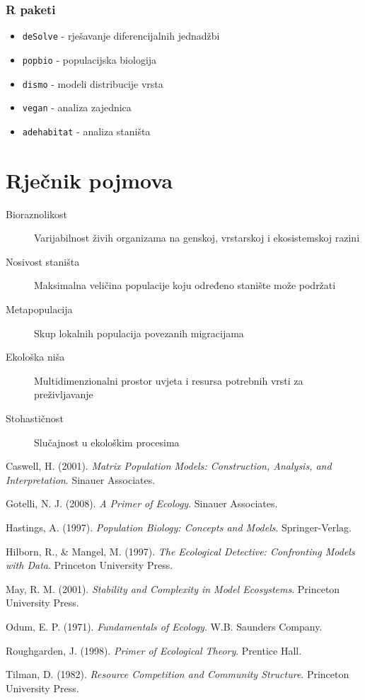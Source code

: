 \documentclass[12pt,a4paper,twoside]{book}
\begin{document}
	\subsection{R paketi}
	\begin{itemize}
		\item \texttt{deSolve} - rješavanje diferencijalnih jednadžbi
		\item \texttt{popbio} - populacijska biologija
		\item \texttt{dismo} - modeli distribucije vrsta
		\item \texttt{vegan} - analiza zajednica
		\item \texttt{adehabitat} - analiza staništa
	\end{itemize}
	
	\chapter{Rječnik pojmova}
	
	\begin{description}
		\item[Bioraznolikost] Varijabilnost živih organizama na genskoj, vrstarskoj i ekosistemskoj razini
		\item[Nosivost staništa] Maksimalna veličina populacije koju određeno stanište može podržati
		\item[Metapopulacija] Skup lokalnih populacija povezanih migracijama
		\item[Ekološka niša] Multidimenzionalni prostor uvjeta i resursa potrebnih vrsti za preživljavanje
		\item[Stohastičnost] Slučajnost u ekološkim procesima
	\end{description}
	
	\backmatter
	
	\begin{thebibliography}{99}
		
		Caswell, H. (2001). \textit{Matrix Population Models: Construction, Analysis, and Interpretation}. Sinauer Associates.
		
		Gotelli, N. J. (2008). \textit{A Primer of Ecology}. Sinauer Associates.
		
		Hastings, A. (1997). \textit{Population Biology: Concepts and Models}. Springer-Verlag.
		
		Hilborn, R., \& Mangel, M. (1997). \textit{The Ecological Detective: Confronting Models with Data}. Princeton University Press.
		
		May, R. M. (2001). \textit{Stability and Complexity in Model Ecosystems}. Princeton University Press.
		
		Odum, E. P. (1971). \textit{Fundamentals of Ecology}. W.B. Saunders Company.
		
		Roughgarden, J. (1998). \textit{Primer of Ecological Theory}. Prentice Hall.
		
		Tilman, D. (1982). \textit{Resource Competition and Community Structure}. Princeton University Press.
		
	\end{thebibliography}
	
\end{document}
